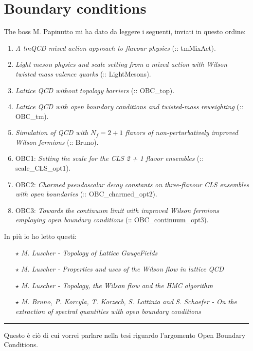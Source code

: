 \documentclass[12pt,a4paper,openright]{article}
\newcommand{\obc}{Open Boundary Conditions}
\begin{document}
\section{Boundary conditions}
The boss M. Papinutto mi ha dato da leggere i seguenti, inviati in questo ordine:
\begin{enumerate}
  \item {\it A tmQCD mixed-action approach to flavour physics} (:: tmMixAct).
  \item {\it Light meson physics and scale setting from a mixed action with Wilson twisted mass valence quarks} (:: LightMesons).
  \item {\it Lattice QCD without topology barriers} (:: OBC\_top).
  \item {\it Lattice QCD with open boundary conditions and twisted-mass reweighting} (:: OBC\_tm).
  \item {\it Simulation of QCD with $N_f = 2 + 1$ flavors of non-perturbatively improved Wilson fermions} (:: Bruno).
  \item OBC1: {\it Setting the scale for the CLS 2 + 1 flavor ensembles} (:: scale\_CLS\_opt1).
  \item OBC2: {\it Charmed pseudoscalar decay constants on three-flavour CLS ensembles with open boundaries} (:: OBC\_charmed\_opt2).
  \item OBC3: {\it Towards the continuum limit with improved Wilson fermions employing open boundary conditions} (:: OBC\_continuum\_opt3).
\end{enumerate}
In più io ho letto questi:
\begin{itemize}
  \item [$\star$] {\it M. Luscher - Topology of Lattice GaugeFields}
  \item [$\star$] {\it M. Luscher - Properties and uses of the Wilson flow in lattice QCD}
  \item [$\star$] {\it M. Luscher - Topology, the Wilson flow and the HMC algorithm}
  \item [$\star$] {\it M. Bruno, P. Korcyla, T. Korzecb, S. Lottinia and S. Schaefer - On the extraction of spectral quantities with open boundary conditions}
\end{itemize}
\hrule
\vspace*{2mm}
Questo è ciò di cui vorrei parlare nella tesi riguardo l'argomento \obc.
\end{document}
